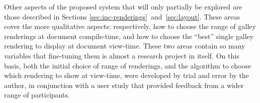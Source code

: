 Other aspects of the proposed system that will only partially be explored are those described in Sections \ref{sec:inc-renderings}~and~\ref{sec:layout}. These areas cover the more qualitative aspects: respectively, how to choose the range of \gls{galley} renderings at document compile-time, and how to choose the ``best'' single \gls{galley} rendering to display at document view-time. These two areas contain so many variables that fine-tuning them is almost a research project in itself. On this basis, both the initial choice of range of renderings, and the algorithm to choose which rendering to show at view-time, were developed by trial and error by the author, in conjunction with a user study that provided feedback from a wider range of participants.
